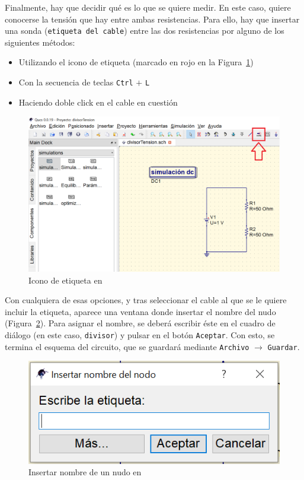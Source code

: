 \documentclass[a4paper,10pt]{article} %
\begin{document}
Finalmente, hay que decidir qué es lo que se quiere medir. En este caso, quiere conocerse la tensión que hay entre ambas resistencias. Para ello, hay que insertar una sonda (\texttt{etiqueta del cable}) entre las dos resistencias por alguno de los siguientes métodos:
\begin{itemize}
    \item Utilizando el icono de etiqueta (marcado en rojo en la Figura~\ref{fig.qucs8})
    \item Con la secuencia de teclas \texttt{Ctrl} $+$ \texttt{L}
    \item Haciendo doble click en el cable en cuestión
\end{itemize}
    \begin{figure}[htbp]
        \centering
        \includegraphics[width=0.5\linewidth]{../figs/qucs8.png}
        \caption{Icono de etiqueta en \qucs}
        \label{fig.qucs8}
    \end{figure}

Con cualquiera de esas opciones, y tras seleccionar el cable al que se le quiere incluir la etiqueta, aparece una ventana donde insertar el nombre del nudo (Figura~\ref{fig.qucs9}). Para asignar el nombre, se deberá escribir éste en el cuadro de diálogo (en este caso, \texttt{divisor}) y pulsar en el botón \texttt{Aceptar}. Con esto, se termina el esquema del circuito, que se guardará mediante \texttt{Archivo} $\rightarrow$ \texttt{Guardar}. 
\begin{figure}[htbp]
    \centering
    \includegraphics[width=0.35\linewidth]{../figs/qucs9.PNG}
    \caption{Insertar nombre de un nudo en \qucs}
    \label{fig.qucs9}
\end{figure}
\end{document}
